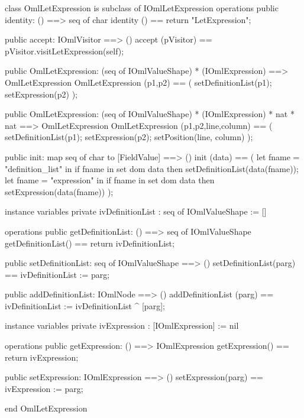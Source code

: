\begin{vdm_al}
class OmlLetExpression is subclass of IOmlLetExpression
operations
  public identity: () ==> seq of char
  identity () == return "LetExpression";

  public accept: IOmlVisitor ==> ()
  accept (pVisitor) == pVisitor.visitLetExpression(self);

  public OmlLetExpression:
    (seq of IOmlValueShape) *
    (IOmlExpression) ==> OmlLetExpression
  OmlLetExpression (p1,p2) == 
    ( setDefinitionList(p1);
      setExpression(p2) );

  public OmlLetExpression:
    (seq of IOmlValueShape) *
    (IOmlExpression) *
    nat *
    nat ==> OmlLetExpression
  OmlLetExpression (p1,p2,line,column) == 
    ( setDefinitionList(p1);
      setExpression(p2);
      setPosition(line, column) );

  public init: map seq of char to [FieldValue] ==> ()
  init (data) ==
    ( let fname = "definition_list" in
        if fname in set dom data
        then setDefinitionList(data(fname));
      let fname = "expression" in
        if fname in set dom data
        then setExpression(data(fname)) );

instance variables
  private ivDefinitionList : seq of IOmlValueShape := []

operations
  public getDefinitionList: () ==> seq of IOmlValueShape
  getDefinitionList() == return ivDefinitionList;

  public setDefinitionList: seq of IOmlValueShape ==> ()
  setDefinitionList(parg) == ivDefinitionList := parg;

  public addDefinitionList: IOmlNode ==> ()
  addDefinitionList (parg) == ivDefinitionList := ivDefinitionList ^ [parg];

instance variables
  private ivExpression : [IOmlExpression] := nil

operations
  public getExpression: () ==> IOmlExpression
  getExpression() == return ivExpression;

  public setExpression: IOmlExpression ==> ()
  setExpression(parg) == ivExpression := parg;

end OmlLetExpression
\end{vdm_al}

